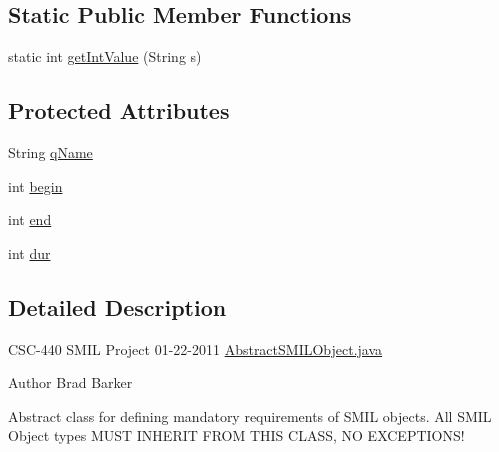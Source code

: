 \subsection*{Static Public Member Functions}
\begin{DoxyCompactItemize}
\item 
static int \hyperlink{classcsc440_1_1nuf_1_1components_1_1_abstract_s_m_i_l_object_ae06070ab4e7007117abd32b189afde97}{get\-Int\-Value} (String s)
\end{DoxyCompactItemize}
\subsection*{Protected Attributes}
\begin{DoxyCompactItemize}
\item 
String \hyperlink{classcsc440_1_1nuf_1_1components_1_1_abstract_s_m_i_l_object_a6f53b3bd6f031aea98d92c84ddd8c8db}{q\-Name}
\item 
int \hyperlink{classcsc440_1_1nuf_1_1components_1_1_abstract_s_m_i_l_object_a3279cee1dba4afdcc793a276d05bb7a1}{begin}
\item 
int \hyperlink{classcsc440_1_1nuf_1_1components_1_1_abstract_s_m_i_l_object_a5c7bbcdd66246002bc2c6de93cbef802}{end}
\item 
int \hyperlink{classcsc440_1_1nuf_1_1components_1_1_abstract_s_m_i_l_object_a8e4a82668aeae5fb178466d5579cd1e9}{dur}
\end{DoxyCompactItemize}


\subsection{Detailed Description}
C\-S\-C-\/440 S\-M\-I\-L Project 01-\/22-\/2011 \hyperlink{_abstract_s_m_i_l_object_8java}{Abstract\-S\-M\-I\-L\-Object.\-java} \begin{DoxyAuthor}{Author}
Brad Barker
\end{DoxyAuthor}
Abstract class for defining mandatory requirements of S\-M\-I\-L objects. All S\-M\-I\-L Object types M\-U\-S\-T I\-N\-H\-E\-R\-I\-T F\-R\-O\-M T\-H\-I\-S C\-L\-A\-S\-S, N\-O E\-X\-C\-E\-P\-T\-I\-O\-N\-S! 

